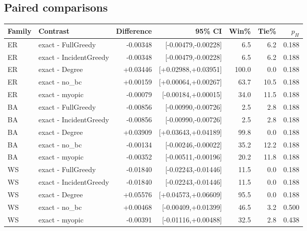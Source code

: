 \documentclass[11pt]{article}
\begin{document}
\subsection{Paired comparisons}
\begin{longtable}{llrrrrr}
\toprule Family & Contrast & Difference & 95\% CI & Win\% & Tie\% & $p_H$\\ \midrule\endhead
ER & exact - FullGreedy & -0.00348 & [-0.00479,-0.00228] & 6.5 & 6.2 & 0.188\\
ER & exact - IncidentGreedy & -0.00348 & [-0.00479,-0.00228] & 6.5 & 6.2 & 0.188\\
ER & exact - Degree & +0.03446 & [+0.02988,+0.03951] & 100.0 & 0.0 & 0.188\\
ER & exact - no\_bc & +0.00159 & [+0.00064,+0.00267] & 63.7 & 10.5 & 0.188\\
ER & exact - myopic & -0.00079 & [-0.00184,+0.00015] & 34.0 & 11.5 & 0.188\\
BA & exact - FullGreedy & -0.00856 & [-0.00990,-0.00726] & 2.5 & 2.8 & 0.188\\
BA & exact - IncidentGreedy & -0.00856 & [-0.00990,-0.00726] & 2.5 & 2.8 & 0.188\\
BA & exact - Degree & +0.03909 & [+0.03643,+0.04189] & 99.8 & 0.0 & 0.188\\
BA & exact - no\_bc & -0.00134 & [-0.00246,-0.00022] & 35.2 & 12.2 & 0.188\\
BA & exact - myopic & -0.00352 & [-0.00511,-0.00196] & 20.2 & 11.8 & 0.188\\
WS & exact - FullGreedy & -0.01840 & [-0.02243,-0.01446] & 11.5 & 0.0 & 0.188\\
WS & exact - IncidentGreedy & -0.01840 & [-0.02243,-0.01446] & 11.5 & 0.0 & 0.188\\
WS & exact - Degree & +0.05576 & [+0.04573,+0.06609] & 95.5 & 0.0 & 0.188\\
WS & exact - no\_bc & +0.00468 & [-0.00409,+0.01399] & 46.5 & 3.2 & 0.500\\
WS & exact - myopic & -0.00391 & [-0.01116,+0.00488] & 32.5 & 2.8 & 0.438\\
\bottomrule\end{longtable}
\end{document}
